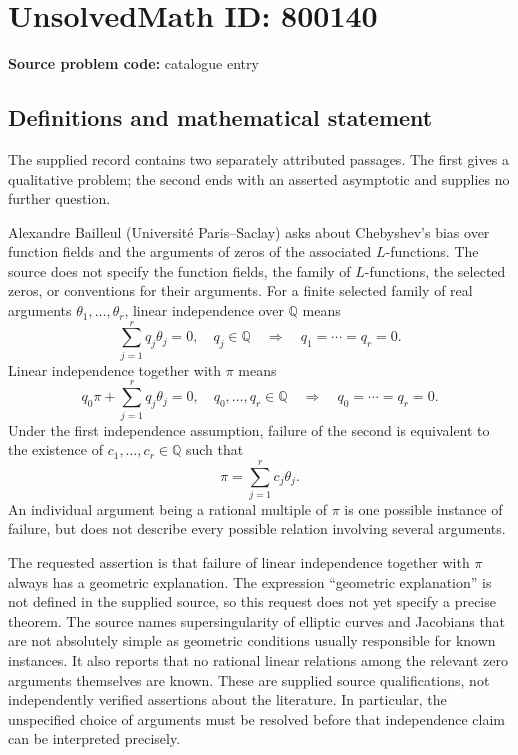 \documentclass[11pt]{article}
\newcommand{\Q}{\mathbb{Q}}
\begin{document}
\section*{UnsolvedMath ID: 800140}
\textbf{Source problem code:} catalogue entry
\subsection{Definitions and mathematical statement}
The supplied record contains two separately attributed passages. The first gives a qualitative problem; the second ends with an asserted asymptotic and supplies no further question.

Alexandre Bailleul (Université Paris--Saclay) asks about Chebyshev's bias over function fields and the arguments of zeros of the associated \(L\)-functions. The source does not specify the function fields, the family of \(L\)-functions, the selected zeros, or conventions for their arguments. For a finite selected family of real arguments \(\theta_1,\ldots,\theta_r\), linear independence over \(\Q\) means
\[
\sum_{j=1}^{r}q_j\theta_j=0,\quad q_j\in\Q
\quad\Longrightarrow\quad q_1=\cdots=q_r=0.
\]
Linear independence together with \(\pi\) means
\[
q_0\pi+\sum_{j=1}^{r}q_j\theta_j=0,\quad q_0,\ldots,q_r\in\Q
\quad\Longrightarrow\quad q_0=\cdots=q_r=0.
\]
Under the first independence assumption, failure of the second is equivalent to the existence of \(c_1,\ldots,c_r\in\Q\) such that
\[
\pi=\sum_{j=1}^{r}c_j\theta_j.
\]
An individual argument being a rational multiple of \(\pi\) is one possible instance of failure, but does not describe every possible relation involving several arguments.

The requested assertion is that failure of linear independence together with \(\pi\) always has a geometric explanation. The expression ``geometric explanation'' is not defined in the supplied source, so this request does not yet specify a precise theorem. The source names supersingularity of elliptic curves and Jacobians that are not absolutely simple as geometric conditions usually responsible for known instances. It also reports that no rational linear relations among the relevant zero arguments themselves are known. These are supplied source qualifications, not independently verified assertions about the literature. In particular, the unspecified choice of arguments must be resolved before that independence claim can be interpreted precisely.
\end{document}
